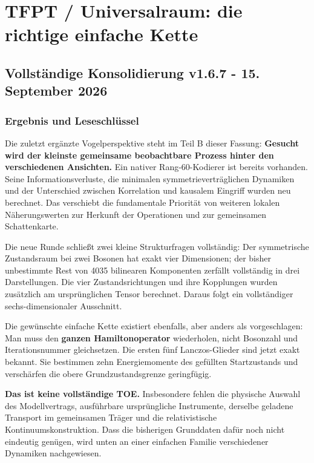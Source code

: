 

{
\setcounter{tocdepth}{2}
\tableofcontents
}
\section{TFPT / Universalraum: die richtige einfache
Kette}\label{tfpt-universalraum-die-richtige-einfache-kette}

\subsection{Vollständige Konsolidierung v1.6.7 - 15. September
2026}\label{vollstuxe4ndige-konsolidierung-v1.6.7---15.-september-2026}

\subsubsection{Ergebnis und
Leseschlüssel}\label{ergebnis-und-leseschluxfcssel}

Die zuletzt ergänzte Vogelperspektive steht im Teil B dieser Fassung:
\textbf{Gesucht wird der kleinste gemeinsame beobachtbare Prozess hinter
den verschiedenen Ansichten.} Ein nativer Rang-60-Kodierer ist bereits
vorhanden. Seine Informationsverluste, die minimalen
symmetrieverträglichen Dynamiken und der Unterschied zwischen
Korrelation und kausalem Eingriff wurden neu berechnet. Das verschiebt
die fundamentale Priorität von weiteren lokalen Näherungswerten zur
Herkunft der Operationen und zur gemeinsamen Schattenkarte.

Die neue Runde schließt zwei kleine Strukturfragen vollständig: Der
symmetrische Zustandsraum bei zwei Bosonen hat exakt vier Dimensionen;
der bisher unbestimmte Rest von 4035 bilinearen Komponenten zerfällt
vollständig in drei Darstellungen. Die vier Zustandsrichtungen und ihre
Kopplungen wurden zusätzlich am ursprünglichen Tensor berechnet. Daraus
folgt ein vollständiger sechs-dimensionaler Ausschnitt.

Die gewünschte einfache Kette existiert ebenfalls, aber anders als
vorgeschlagen: Man muss den \textbf{ganzen Hamiltonoperator}
wiederholen, nicht Bosonzahl und Iterationsnummer gleichsetzen. Die
ersten fünf Lanczos-Glieder sind jetzt exakt bekannt. Sie bestimmen zehn
Energiemomente des gefüllten Startzustands und verschärfen die obere
Grundzustandsgrenze geringfügig.

\textbf{Das ist keine vollständige TOE.} Insbesondere fehlen die
physische Auswahl des Modellvertrags, ausführbare ursprüngliche
Instrumente, derselbe geladene Transport im gemeinsamen Träger und die
relativistische Kontinuumskonstruktion. Dass die bisherigen Grunddaten
dafür noch nicht eindeutig genügen, wird unten an einer einfachen
Familie verschiedener Dynamiken nachgewiesen.

